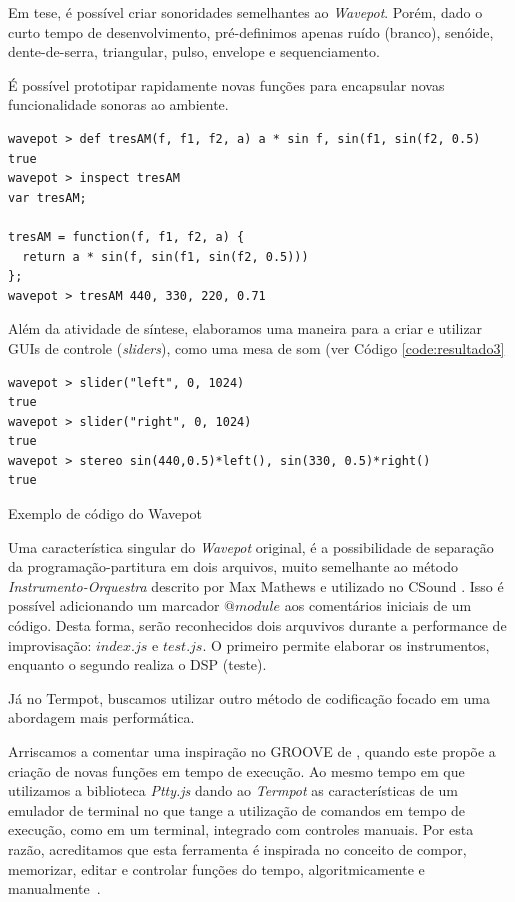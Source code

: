 Em tese, é possível criar sonoridades semelhantes ao \emph{Wavepot}. Porém, dado o curto tempo de desenvolvimento, pré-definimos apenas ruído (branco), senóide, dente-de-serra, triangular, pulso, envelope e sequenciamento.

É possível prototipar rapidamente novas funções para encapsular novas funcionalidade sonoras ao ambiente.

\begin{listing}
\begin{verbatim}
wavepot > def tresAM(f, f1, f2, a) a * sin f, sin(f1, sin(f2, 0.5)
true
wavepot > inspect tresAM
var tresAM;

tresAM = function(f, f1, f2, a) {
  return a * sin(f, sin(f1, sin(f2, 0.5)))
};
wavepot > tresAM 440, 330, 220, 0.71 
\end{verbatim}
\label{code:resultado2}
\end{listing}

Além da atividade de síntese, elaboramos uma maneira para a criar e utilizar GUIs de controle (\emph{sliders}), como uma mesa de som (ver Código \ref{code:resultado3}

\begin{listing}
\begin{verbatim}
wavepot > slider("left", 0, 1024)
true
wavepot > slider("right", 0, 1024)
true
wavepot > stereo sin(440,0.5)*left(), sin(330, 0.5)*right()
true
\end{verbatim}
\caption{Exemplo de código do Wavepot}
\label{code:resultado3}
\end{listing}


Uma característica singular do \emph{Wavepot} original, é a possibilidade de separação da programação-partitura em dois arquivos, muito semelhante ao método \emph{Instrumento-Orquestra} descrito por Max Mathews e utilizado no CSound \cite{mathews_digital_1963, di_nunzio_genesi_2010}.
Isso é possível adicionando um marcador $@module$ aos comentários iniciais de um código.
Desta forma, serão reconhecidos dois arquvivos durante a performance de improvisação: $index.js$ e $test.js$.
O primeiro permite elaborar os instrumentos, enquanto o segundo realiza o DSP (teste).

Já no Termpot, buscamos utilizar outro método de codificação focado em uma abordagem mais performática.


Arriscamos a comentar uma inspiração no GROOVE de \cite{mathews_groove_1970,nunzio_groove_2010}, quando este propõe a criação de novas funções em tempo de execução. Ao mesmo tempo em que utilizamos a biblioteca \emph{Ptty.js} dando ao \emph{Termpot} as características de um emulador de terminal no que tange a utilização de comandos em tempo de execução, como em um terminal, integrado com controles manuais.
Por esta razão, acreditamos que esta ferramenta é inspirada no conceito de compor, memorizar, editar e controlar funções do tempo, algoritmicamente e manualmente~\cite{mathews_groove_1970}.


